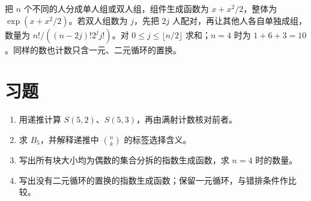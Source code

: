 \begin{example}[单人和配对]
把 $n$ 个不同的人分成单人组或双人组，组件生成函数为 $x+x^2/2$，整体为 $\exp(x+x^2/2)$。若双人组数为 $j$，先把 $2j$ 人配对，再让其他人各自单独成组，数量为 $n!/((n-2j)!2^jj!)$。对 $0\le j\le\lfloor n/2\rfloor$ 求和；$n=4$ 时为 $1+6+3=10$。同样的数也计数只含一元、二元循环的置换。
\end{example}

\section{习题}
\begin{enumerate}
  \item\label{ex:egf-1} 用递推计算 $S(5,2)$、$S(5,3)$，再由满射计数核对前者。
  \item\label{ex:egf-2} 求 $B_5$，并解释递推中 $\binom nk$ 的标签选择含义。
  \item\label{ex:egf-3} 写出所有块大小均为偶数的集合分拆的指数生成函数，求 $n=4$ 时的数量。
  \item\label{ex:egf-4} 写出没有二元循环的置换的指数生成函数；保留一元循环，与错排条件作比较。
\end{enumerate}

